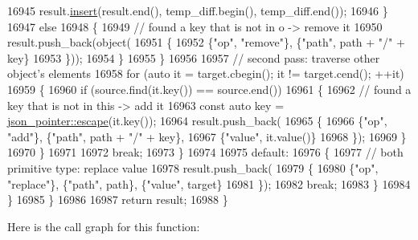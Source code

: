 \begin{DoxyCode}
16945                             result.\hyperlink{classnlohmann_1_1basic__json_a0136728f5db69d4051c77b94307abd6c}{insert}(result.end(), temp\_diff.begin(), temp\_diff.end());
16946                         \}
16947                         \textcolor{keywordflow}{else}
16948                         \{
16949                             \textcolor{comment}{// found a key that is not in o -> remove it}
16950                             result.push\_back(\textcolor{keywordtype}{object}(
16951                             \{
16952                                 \{\textcolor{stringliteral}{"op"}, \textcolor{stringliteral}{"remove"}\}, \{\textcolor{stringliteral}{"path"}, path + \textcolor{stringliteral}{"/"} + key\}
16953                             \}));
16954                         \}
16955                     \}
16956 
16957                     \textcolor{comment}{// second pass: traverse other object's elements}
16958                     \textcolor{keywordflow}{for} (\textcolor{keyword}{auto} it = target.cbegin(); it != target.cend(); ++it)
16959                     \{
16960                         \textcolor{keywordflow}{if} (source.find(it.key()) == source.end())
16961                         \{
16962                             \textcolor{comment}{// found a key that is not in this -> add it}
16963                             \textcolor{keyword}{const} \textcolor{keyword}{auto} key = \hyperlink{classnlohmann_1_1json__pointer_a8abf3577f9a0087f29a233893cdc73ad}{json\_pointer::escape}(it.key());
16964                             result.push\_back(
16965                             \{
16966                                 \{\textcolor{stringliteral}{"op"}, \textcolor{stringliteral}{"add"}\}, \{\textcolor{stringliteral}{"path"}, path + \textcolor{stringliteral}{"/"} + key\},
16967                                 \{\textcolor{stringliteral}{"value"}, it.value()\}
16968                             \});
16969                         \}
16970                     \}
16971 
16972                     \textcolor{keywordflow}{break};
16973                 \}
16974 
16975                 \textcolor{keywordflow}{default}:
16976                 \{
16977                     \textcolor{comment}{// both primitive type: replace value}
16978                     result.push\_back(
16979                     \{
16980                         \{\textcolor{stringliteral}{"op"}, \textcolor{stringliteral}{"replace"}\}, \{\textcolor{stringliteral}{"path"}, path\}, \{\textcolor{stringliteral}{"value"}, target\}
16981                     \});
16982                     \textcolor{keywordflow}{break};
16983                 \}
16984             \}
16985         \}
16986 
16987         \textcolor{keywordflow}{return} result;
16988     \}
\end{DoxyCode}
Here is the call graph for this function\+:
\mbox{\label{classnlohmann_1_1basic__json_a5adea76fedba9898d404fef8598aa663}} 
